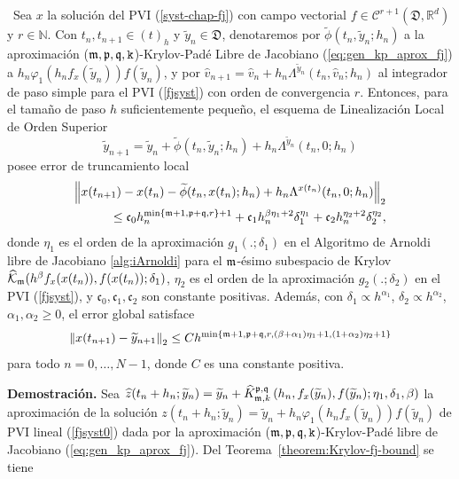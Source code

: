 \begin{theorem}\label{theorem:kp-fj-llrk-convergence}
	\cite{naranjo2023jacobian}~Sea $x$ la solución del PVI (\ref{syst-chap-fj}) con campo vectorial $f\in \mathcal{C}^{r+1}(\mathfrak{D}, \mathbb{R}^d)$ y $r \in \mathbb{N}$.
	Con $t_n,t_{n+1}\in (t)_h$ y $\widetilde{y}_n \in \mathfrak{D}$, denotaremos por $\widetilde{\phi}(t_n,\widetilde{y}_n;h_n)$ a la aproximación ($\mathfrak{m},\mathfrak{p},\mathfrak{q},\mathtt{k}$)-Krylov-Padé Libre de Jacobiano (\ref{eq:gen_kp_aprox_fj}) a $h_n\varphi_1(h_nf_x(\widetilde{y}_n))f(\widetilde{y}_n)$,
	y por $\widehat{v}_{n+1}=\widehat{v}_n+h_n\Lambda^{\widetilde{y}_n}(t_n,\widehat{v}_n;h_n)$ al integrador de paso simple para el PVI (\ref{fjsyst}) con orden de convergencia $r$. Entonces, para el tamaño de paso $h$ suficientemente pequeño, el esquema de Linealización Local de Orden Superior
	\begin{equation}
	\widetilde{y}_{n+1}= \widetilde{y}_n+\widetilde{\phi}(t_n,\widetilde{y}_n;h_n)+h_n\Lambda^{\widetilde{y}_n}(t_n,0;h_n) \label{JFKPHOLL}
	\end{equation}
	posee error de truncamiento local
	\begin{align}
	\left\lVert x(t_{n+1})-x(t_n)-\widetilde{\phi}(t_n,x(t_n);h_n)+h_n\Lambda^{x(t_n)}(t_n,0;h_n) \right\rVert_2 \\ \leq \mathfrak{c}_0h_n^{\min\{\mathfrak{m}+1,\mathfrak{p}+\mathfrak{q},r \}+1} + \mathfrak{c}_1h_n^{\beta\eta_1+2}\delta_1^{\eta_1} + \mathfrak{c}_2h_n^{\eta_2+2}\delta_2^{\eta_2}, \nonumber
	\end{align}
	donde $\eta_1$ es el orden de la aproximación $g_1(.;\delta_1)$ en el Algoritmo de Arnoldi libre de Jacobiano \ref{alg:iArnoldi} para el $\mathfrak{m}$-ésimo subespacio de Krylov $\widehat{\mathcal{K}}_{\mathfrak{m}}(h^\beta f_x(x(t_n)),f(x(t_n));\delta_1)$, $\eta_2$  es el orden de la aproximación $g_2(.;\delta_2)$ en el PVI (\ref{fjsyst}), y $\mathfrak{c}_0,\mathfrak{c}_1,\mathfrak{c}_2$ son constante positivas.
	Además, con $\delta_1\propto h^{\alpha_1}$, $\delta_2\propto h^{\alpha_2}$, $\alpha_1,\alpha_2 \geq 0$, el error global satisface
	\[ \left\lVert x(t_{n+1})-\widetilde{y}_{n+1} \right\rVert_2\leq Ch^{\min\{\mathfrak{m}+1,\mathfrak{p}+\mathfrak{q},r,(\beta+\alpha_1)\eta_1+1,(1+\alpha_2)\eta_2+1\}} \]
	para todo $n=0,\ldots,N-1$, donde $C$ es una constante positiva.
\end{theorem}
\textbf{Demostración.} Sea $\widehat{z}(t_n+h_n;\widetilde{y}_n)=\widetilde{y}_n+\widehat{K}_{\mathfrak{m},k}^{\mathfrak{p},\mathfrak{q}}\left(h_n,f_x(\widetilde{y}_n), f(\widetilde{y}_n); \eta_1, \delta_1, \beta \right)$ la aproximación de la solución $z(t_n+h_n;\widetilde{y}_n)=\widetilde{y}_n+h_n\varphi_1(h_nf_x(\widetilde{y}_n))f(\widetilde{y}_n)$ de PVI lineal (\ref{fjsyst0}) dada por la aproximación ($\mathfrak{m},\mathfrak{p},\mathfrak{q},\mathtt{k}$)-Krylov-Padé libre de Jacobiano  (\ref{eq:gen_kp_aprox_fj}). Del Teorema~\ref{theorem:Krylov-fj-bound} se tiene
